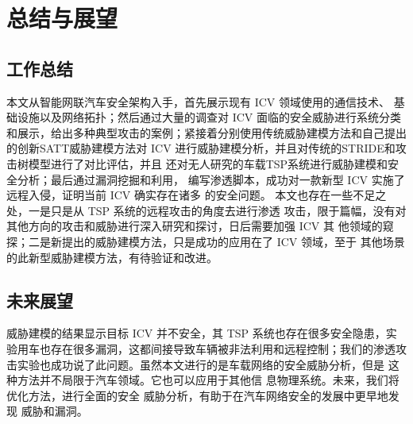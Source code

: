 \chapter{总结与展望}
\label{ch6}

\section{工作总结}
本文从智能网联汽车安全架构入手，首先展示现有 ICV 领域使用的通信技术、
基础设施以及网络拓扑；然后通过大量的调查对 ICV 面临的安全威胁进行系统分类
和展示，给出多种典型攻击的案例；紧接着分别使用传统威胁建模方法和自己提出
的创新SATT威胁建模方法对 ICV 进行威胁建模分析，并且对传统的STRIDE和攻击树模型进行了对比评估，并且
还对无人研究的车载TSP系统进行威胁建模和安全分析；最后通过漏洞挖掘和利用，
编写渗透脚本，成功对一款新型 ICV 实施了远程入侵，证明当前 ICV 确实存在诸多
的安全问题。
本文也存在一些不足之处，一是只是从 TSP 系统的远程攻击的角度去进行渗透
攻击，限于篇幅，没有对其他方向的攻击和威胁进行深入研究和探讨，日后需要加强 ICV 其
他领域的窥探；二是新提出的威胁建模方法，只是成功的应用在了 ICV 领域，至于
其他场景的此新型威胁建模方法，有待验证和改进。

\section{未来展望}

威胁建模的结果显示目标 ICV 并不安全，其 TSP 系统也存在很多安全隐患，实
验用车也存在很多漏洞，这都间接导致车辆被非法利用和远程控制；我们的渗透攻
击实验也成功说了此问题。虽然本文进行的是车载网络的安全威胁分析，但是
这种方法并不局限于汽车领域。它也可以应用于其他信
息物理系统。未来，我们将优化方法，进行全面的安全
威胁分析，有助于在汽车网络安全的发展中更早地发现
威胁和漏洞。